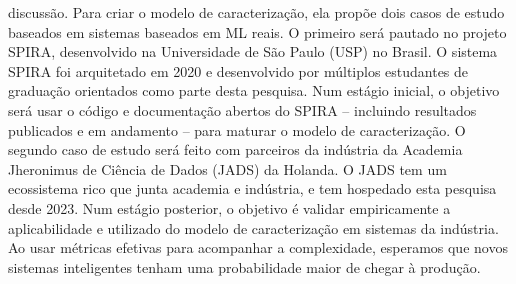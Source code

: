 {discussão. Para criar o modelo de caracterização, ela propõe dois casos de
estudo baseados em sistemas baseados em ML reais. O primeiro será pautado no
projeto SPIRA, desenvolvido na Universidade de São Paulo (USP) no Brasil. O
sistema SPIRA foi arquitetado em 2020 e desenvolvido por múltiplos estudantes de
graduação orientados como parte desta pesquisa. Num estágio inicial, o objetivo
será usar o código e documentação abertos do SPIRA -- incluindo resultados
publicados e em andamento -- para maturar o modelo de caracterização. O segundo
caso de estudo será feito com parceiros da indústria da Academia Jheronimus de
Ciência de Dados (JADS) da Holanda. O JADS tem um ecossistema rico que junta
academia e indústria, e tem hospedado esta pesquisa desde 2023. Num estágio
posterior, o objetivo é validar empiricamente a aplicabilidade e utilizado do
modelo de caracterização em sistemas da indústria. Ao usar métricas efetivas
para acompanhar a complexidade, esperamos que novos sistemas inteligentes tenham
uma probabilidade maior de chegar à produção.
}

